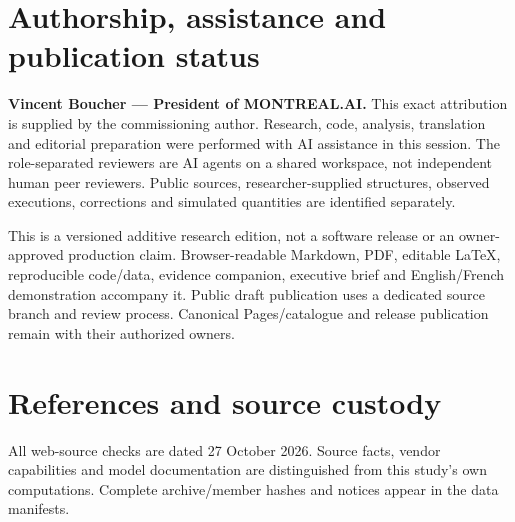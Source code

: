\documentclass[
  11pt,
]{article}
\let\OriginalSection\section
\renewcommand{\section}{\needspace{5\baselineskip}\OriginalSection}
\begin{document}
\hypertarget{authorship-assistance-and-publication-status}{%
\section{Authorship, assistance and publication
status}\label{authorship-assistance-and-publication-status}}

\textbf{Vincent Boucher --- President of MONTREAL.AI.} This exact
attribution is supplied by the commissioning author. Research, code,
analysis, translation and editorial preparation were performed with AI
assistance in this session. The role-separated reviewers are AI agents
on a shared workspace, not independent human peer reviewers. Public
sources, researcher-supplied structures, observed executions,
corrections and simulated quantities are identified separately.

This is a versioned additive research edition, not a software release or
an owner-approved production claim. Browser-readable Markdown, PDF,
editable LaTeX, reproducible code/data, evidence companion, executive
brief and English/French demonstration accompany it. Public draft
publication uses a dedicated source branch and review process. Canonical
Pages/catalogue and release publication remain with their authorized
owners.

\hypertarget{references-and-source-custody}{%
\section{References and source
custody}\label{references-and-source-custody}}

All web-source checks are dated 27 October 2026. Source facts, vendor
capabilities and model documentation are distinguished from this study's
own computations. Complete archive/member hashes and notices appear in
the data manifests.
\end{document}
